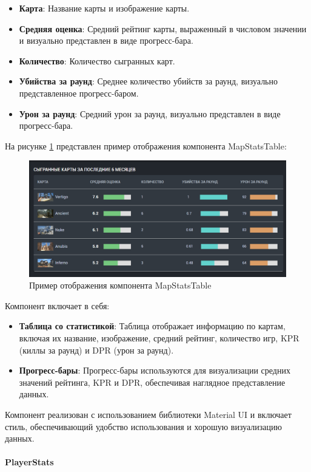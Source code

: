 \begin{itemize}
	\item \textbf{Карта}: Название карты и изображение карты.
	\item \textbf{Средняя оценка}: Средний рейтинг карты, выраженный в числовом значении и визуально представлен в виде прогресс-бара.
	\item \textbf{Количество}: Количество сыгранных карт.
	\item \textbf{Убийства за раунд}: Среднее количество убийств за раунд, визуально представленное прогресс-баром.
	\item \textbf{Урон за раунд}: Средний урон за раунд, визуально представлен в виде прогресс-бара.
\end{itemize}

На рисунке \ref{fig:MapStatsTable} представлен пример отображения компонента MapStatsTable:
\begin{figure}
	\centering
	\includegraphics[width=0.95\linewidth]{images/MapStatsTable}
	\caption{Пример отображения компонента MapStatsTable}
	\label{fig:MapStatsTable}
\end{figure}

Компонент включает в себя:
\begin{itemize}
	\item \textbf{Таблица со статистикой}: Таблица отображает информацию по картам, включая их название, изображение, средний рейтинг, количество игр, KPR (киллы за раунд) и DPR (урон за раунд).
	\item \textbf{Прогресс-бары}: Прогресс-бары используются для визуализации средних значений рейтинга, KPR и DPR, обеспечивая наглядное представление данных.
\end{itemize}

Компонент реализован с использованием библиотеки Material UI и включает стиль, обеспечивающий удобство использования и хорошую визуализацию данных.

\paragraph{PlayerStats}

